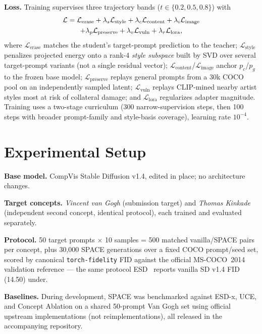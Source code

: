 \documentclass[10pt,twocolumn]{article}
\begin{document}
\textbf{Loss.} Training supervises three trajectory bands ($t\!\in\!\{0.2,0.5,0.8\}$) with
\begin{multline}
\mathcal{L} = \mathcal{L}_{\text{erase}} + \lambda_s\mathcal{L}_{\text{style}} + \lambda_c\mathcal{L}_{\text{content}} + \lambda_i\mathcal{L}_{\text{image}} \\
+ \lambda_p\mathcal{L}_{\text{preserve}} + \lambda_v\mathcal{L}_{\text{vuln}} + \lambda_r\mathcal{L}_{\text{lora}}, \notag
\end{multline}
where $\mathcal{L}_{\text{erase}}$ matches the student's target-prompt prediction to the teacher; $\mathcal{L}_{\text{style}}$ penalizes projected energy onto a rank-4 \emph{style subspace} built by SVD over several target-prompt variants (not a single residual vector); $\mathcal{L}_{\text{content}}$/$\mathcal{L}_{\text{image}}$ anchor $p_c$/$p_g$ to the frozen base model; $\mathcal{L}_{\text{preserve}}$ replays general prompts from a 30k COCO pool on an independently sampled latent; $\mathcal{L}_{\text{vuln}}$ replays CLIP-mined nearby artist styles most at risk of collateral damage; and $\mathcal{L}_{\text{lora}}$ regularizes adapter magnitude. Training uses a two-stage curriculum (300 narrow-supervision steps, then 100 steps with broader prompt-family and style-basis coverage), learning rate $10^{-4}$.

\section{Experimental Setup}
\textbf{Base model.} CompVis Stable Diffusion v1.4, edited in place; no architecture changes.

\textbf{Target concepts.} \emph{Vincent van Gogh} (submission target) and \emph{Thomas Kinkade} (independent second concept, identical protocol), each trained and evaluated separately.

\textbf{Protocol.} 50 target prompts $\times$ 10 samples = 500 matched vanilla/SPACE pairs per concept, plus 30{,}000 SPACE generations over a fixed COCO prompt/seed set, scored by canonical \texttt{torch-fidelity} FID against the official MS-COCO~2014 validation reference --- the same protocol ESD~\cite{esd} reports vanilla SD v1.4 FID (14.50) under.

\textbf{Baselines.} During development, SPACE was benchmarked against ESD-x, UCE, and Concept Ablation on a shared 50-prompt Van Gogh set using official upstream implementations (not reimplementations), all released in the accompanying repository.
\end{document}
